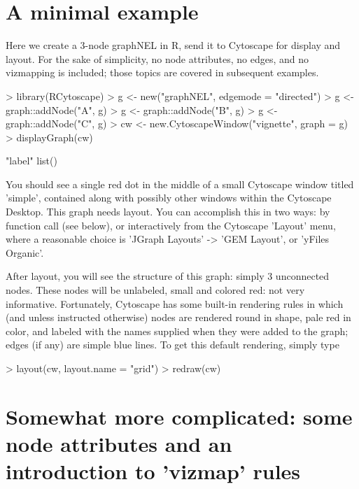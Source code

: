 \documentclass[12pt]{article}
\begin{document}
\section{A minimal example}

Here we create a 3-node graphNEL in R, send it to Cytoscape for display and layout.  For the sake of simplicity, no node attributes, no edges, and no vizmapping is included; those topics are covered in subsequent examples.

\begin{Schunk}
\begin{Sinput}
> library(RCytoscape)
> g <- new("graphNEL", edgemode = "directed")
> g <- graph::addNode("A", g)
> g <- graph::addNode("B", g)
> g <- graph::addNode("C", g)
> cw <- new.CytoscapeWindow("vignette", graph = g)
> displayGraph(cw)
\end{Sinput}
\begin{Soutput}
[1] "label"
list()
\end{Soutput}
\end{Schunk}

You should see a single red dot in the middle of a small Cytoscape window titled 'simple', contained along with possibly
other windows within the Cytoscape Desktop.  This graph needs layout.  You can accomplish this in two ways:  by function call (see below), or interactively from the Cytoscape 'Layout' menu, where a reasonable choice is 'JGraph Layouts' -> 'GEM Layout', or 'yFiles Organic'.

After layout, you will see the structure of this graph:  simply 3 unconnected nodes.  These nodes will be unlabeled, small and colored red: not very informative.  Fortunately, Cytoscape has some built-in rendering rules in which (and unless instructed otherwise) nodes are rendered round in shape, pale red in color, and labeled with the names supplied when they were added to the graph;  edges (if any) are simple blue lines. To get this default rendering, simply type

\begin{Schunk}
\begin{Sinput}
> layout(cw, layout.name = "grid")
> redraw(cw)
\end{Sinput}
\end{Schunk}

\section{Somewhat more complicated:  some node attributes and an introduction to 'vizmap' rules}
\end{document}
